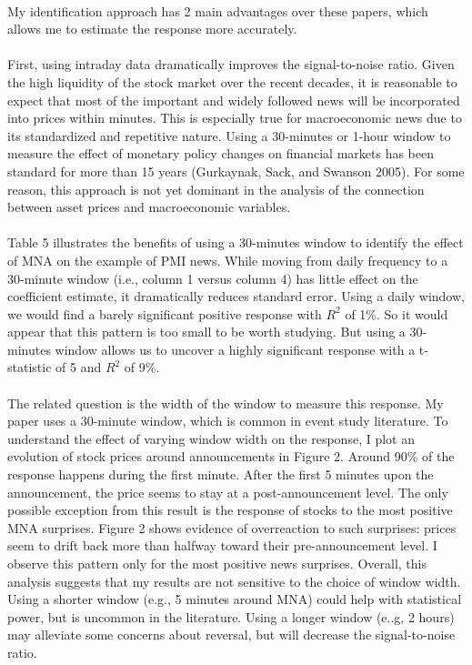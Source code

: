 \documentclass[12pt]{article}
\begin{document}
\paragraph{}
My identification approach has 2 main advantages over these papers, which allows me to estimate the response more accurately.
\paragraph{}
First, using intraday data dramatically improves the signal-to-noise ratio. Given the high liquidity of the stock market over the recent decades, it is reasonable to expect that most of the important and widely followed news will be incorporated into prices within minutes. This is especially true for macroeconomic news due to its standardized and repetitive nature. Using a 30-minutes or 1-hour window to measure the effect of monetary policy changes on financial markets has been standard for more than 15 years (Gurkaynak, Sack, and Swanson 2005). For some reason, this approach is not yet dominant in the analysis of the connection between asset prices and macroeconomic variables.
\paragraph{}
Table 5 illustrates the benefits of using a 30-minutes window to identify the effect of MNA on the example of PMI news. While moving from daily frequency to a 30-minute window (i.e., column 1 versus column 4) has little effect on the coefficient estimate, it dramatically reduces standard error. Using a daily window, we would find a barely significant positive response with $R^2$ of 1\%. So it would appear that this pattern is too small to be worth studying. But using a 30-minutes window allows us to uncover a highly significant response with a t-statistic of 5 and $R^2$ of 9\%.
\paragraph{}
The related question is the width of the window to measure this response. My paper uses a 30-minute window, which is common in event study literature. To understand the effect of varying window width on the response, I plot an evolution of stock prices around announcements in Figure 2. Around 90\% of the response happens during the first minute. After the first 5 minutes upon the announcement, the price seems to stay at a post-announcement level. The only possible exception from this result is the response of stocks to the most positive MNA surprises. Figure 2 shows evidence of overreaction to such surprises: prices seem to drift back more than halfway toward their pre-announcement level. I observe this pattern only for the most positive news surprises. Overall, this analysis suggests that my results are not sensitive to the choice of window width. Using a shorter window (e.g., 5 minutes around MNA) could help with statistical power, but is uncommon in the literature. Using a longer window (e..g, 2 hours) may alleviate some concerns about reversal, but will decrease the signal-to-noise ratio.
\end{document}
